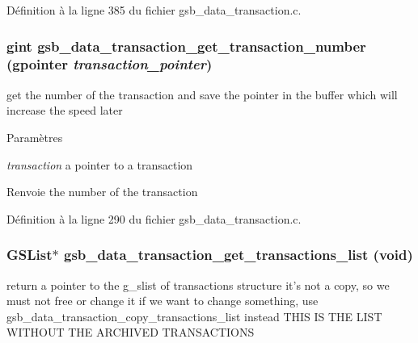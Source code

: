 Définition à la ligne 385 du fichier gsb\_\-data\_\-transaction.c.

\subsubsection[{gsb\_\-data\_\-transaction\_\-get\_\-transaction\_\-number}]{\setlength{\rightskip}{0pt plus 5cm}gint gsb\_\-data\_\-transaction\_\-get\_\-transaction\_\-number (gpointer {\em transaction\_\-pointer})}\label{gsb__data__transaction_8c_a99bf548513083f4a71fe019faeccbe0a}
get the number of the transaction and save the pointer in the buffer which will increase the speed later 
\begin{DoxyParams}{Paramètres}
\item[{\em transaction}]a pointer to a transaction \end{DoxyParams}
\begin{DoxyReturn}{Renvoie}
the number of the transaction 
\end{DoxyReturn}


Définition à la ligne 290 du fichier gsb\_\-data\_\-transaction.c.

\subsubsection[{gsb\_\-data\_\-transaction\_\-get\_\-transactions\_\-list}]{\setlength{\rightskip}{0pt plus 5cm}GSList$\ast$ gsb\_\-data\_\-transaction\_\-get\_\-transactions\_\-list (void)}\label{gsb__data__transaction_8c_af781a71a62eece020188ef62847f2887}
return a pointer to the g\_\-slist of transactions structure it's not a copy, so we must not free or change it if we want to change something, use gsb\_\-data\_\-transaction\_\-copy\_\-transactions\_\-list instead THIS IS THE LIST WITHOUT THE ARCHIVED TRANSACTIONS


